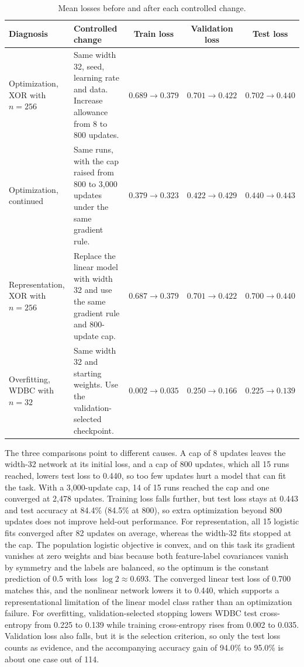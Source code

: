 \documentclass[11pt]{article}
\begin{document}
\begin{table}[H]
\centering
\small
\begin{tabular}{@{}>{\raggedright\arraybackslash}p{2.8cm}>{\raggedright\arraybackslash}p{4.3cm}ccc@{}}
\toprule
Diagnosis & Controlled change & Train loss & Validation loss & Test loss \\
\midrule
Optimization, XOR with $n=256$ & Same width 32, seed, learning rate and data. Increase allowance from 8 to 800 updates. & $0.689\to0.379$ & $0.701\to0.422$ & $0.702\to0.440$ \\
Optimization, continued & Same runs, with the cap raised from 800 to 3,000 updates under the same gradient rule. & $0.379\to0.323$ & $0.422\to0.429$ & $0.440\to0.443$ \\
Representation, XOR with $n=256$ & Replace the linear model with width 32 and use the same gradient rule and 800-update cap. & $0.687\to0.379$ & $0.701\to0.422$ & $0.700\to0.440$ \\
Overfitting, WDBC with $n=32$ & Same width 32 and starting weights. Use the validation-selected checkpoint. & $0.002\to0.035$ & $0.250\to0.166$ & $0.225\to0.139$ \\
\bottomrule
\end{tabular}
\caption{Mean losses before and after each controlled change.}
\end{table}

The three comparisons point to different causes. A cap of 8 updates leaves the width-32 network at its initial loss, and a cap of 800 updates, which all 15 runs reached, lowers test loss to 0.440, so too few updates hurt a model that can fit the task. With a 3,000-update cap, 14 of 15 runs reached the cap and one converged at 2,478 updates. Training loss falls further, but test loss stays at 0.443 and test accuracy at 84.4\% (84.5\% at 800), so extra optimization beyond 800 updates does not improve held-out performance. For representation, all 15 logistic fits converged after 82 updates on average, whereas the width-32 fits stopped at the cap. The population logistic objective is convex, and on this task its gradient vanishes at zero weights and bias because both feature-label covariances vanish by symmetry and the labels are balanced, so the optimum is the constant prediction of 0.5 with loss $\log 2\approx0.693$. The converged linear test loss of 0.700 matches this, and the nonlinear network lowers it to 0.440, which supports a representational limitation of the linear model class rather than an optimization failure. For overfitting, validation-selected stopping lowers WDBC test cross-entropy from 0.225 to 0.139 while training cross-entropy rises from 0.002 to 0.035. Validation loss also falls, but it is the selection criterion, so only the test loss counts as evidence, and the accompanying accuracy gain of 94.0\% to 95.0\% is about one case out of 114.
\end{document}

